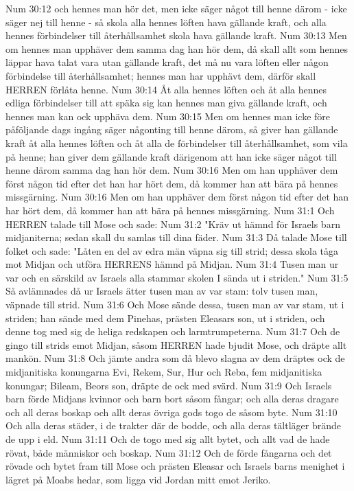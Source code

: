 Num 30:12  och hennes man hör det, men icke säger något till henne därom - icke säger nej till henne - så skola alla hennes löften hava gällande kraft, och alla hennes förbindelser till återhållsamhet skola hava gällande kraft.
Num 30:13  Men om hennes man upphäver dem samma dag han hör dem, då skall allt som hennes läppar hava talat vara utan gällande kraft, det må nu vara löften eller någon förbindelse till återhållsamhet; hennes man har upphävt dem, därför skall HERREN förlåta henne.
Num 30:14  Åt alla hennes löften och åt alla hennes edliga förbindelser till att späka sig kan hennes man giva gällande kraft, och hennes man kan ock upphäva dem.
Num 30:15  Men om hennes man icke före påföljande dags ingång säger någonting till henne därom, så giver han gällande kraft åt alla hennes löften och åt alla de förbindelser till återhållsamhet, som vila på henne; han giver dem gällande kraft därigenom att han icke säger något till henne därom samma dag han hör dem.
Num 30:16  Men om han upphäver dem först någon tid efter det han har hört dem, då kommer han att bära på hennes missgärning.
Num 30:16  Men om han upphäver dem först någon tid efter det han har hört dem, då kommer han att bära på hennes missgärning.
Num 31:1  Och HERREN talade till Mose och sade:
Num 31:2  "Kräv ut hämnd för Israels barn midjaniterna; sedan skall du samlas till dina fäder.
Num 31:3  Då talade Mose till folket och sade: "Låten en del av edra män väpna sig till strid; dessa skola tåga mot Midjan och utföra HERRENS hämnd på Midjan.
Num 31:4  Tusen man ur var och en särskild av Israels alla stammar skolen I sända ut i striden."
Num 31:5  Så avlämnades då ur Israels ätter tusen man av var stam: tolv tusen man, väpnade till strid.
Num 31:6  Och Mose sände dessa, tusen man av var stam, ut i striden; han sände med dem Pinehas, prästen Eleasars son, ut i striden, och denne tog med sig de heliga redskapen och larmtrumpeterna.
Num 31:7  Och de gingo till strids emot Midjan, såsom HERREN hade bjudit Mose, och dräpte allt mankön.
Num 31:8  Och jämte andra som då blevo slagna av dem dräptes ock de midjanitiska konungarna Evi, Rekem, Sur, Hur och Reba, fem midjanitiska konungar; Bileam, Beors son, dräpte de ock med svärd.
Num 31:9  Och Israels barn förde Midjans kvinnor och barn bort såsom fångar; och alla deras dragare och all deras boskap och allt deras övriga gods togo de såsom byte.
Num 31:10  Och alla deras städer, i de trakter där de bodde, och alla deras tältläger brände de upp i eld.
Num 31:11  Och de togo med sig allt bytet, och allt vad de hade rövat, både människor och boskap.
Num 31:12  Och de förde fångarna och det rövade och bytet fram till Mose och prästen Eleasar och Israels barns menighet i lägret på Moabs hedar, som ligga vid Jordan mitt emot Jeriko.
